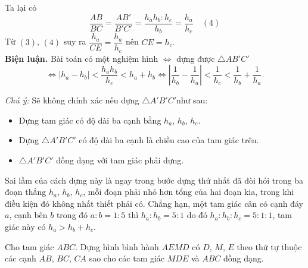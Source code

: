 \begin{bt}
{Ta lại có
$$\dfrac{AB}{BC}=\dfrac{AB'}{B'C'} =\dfrac{h_ah_b:h_c}{h_b}=\dfrac{h_a}{h_c} \quad (4)$$
Từ $ (3) $, $ (4) $ suy ra $ \dfrac{h_a}{CE}=\dfrac{h_a}{h_c} $ nên $ CE=h_c. $\\
\textbf{Biện luận.} Bài toán có một nghiệm hình $ \Leftrightarrow $ dựng được $ \triangle AB'C' $ 
$$ \Leftrightarrow \left|h_a-h_b\right| < \dfrac{h_ah_b}{h_c} < h_a + h_b \Leftrightarrow \left|\dfrac{1}{h_b}-\dfrac{1}{h_a}\right| < \dfrac{1}{h_c}<\dfrac{1}{h_b}+\dfrac{1}{h_a}. $$
\begin{note}{\textit{Chú ý: }}
Sẽ không chính xác nếu dựng $ \triangle A'B'C' $như sau:
\begin{itemize}
	\item Dựng tam giác có độ dài ba cạnh bằng $ h_a $, $ h_b $, $ h_c $.
	\item Dựng $ \triangle A'B'C' $ có độ dài ba cạnh là chiều cao của tam giác trên.
	\item $ \triangle A'B'C' $ đồng dạng với tam giác phải dựng.
\end{itemize}
Sai lầm của cách dựng này là ngay trong bước dựng thứ nhất đã đòi hỏi trong ba đoạn thẳng $ h_a $, $ h_b $, $ h_c $, mỗi đoạn phải nhỏ hơn tổng của hai đoạn kia, trong khi điều kiện đó không nhất thiết phải có. Chẳng hạn, một tam giác cân có cạnh đáy $ a $, cạnh bên $ b $ trong đó $ a:b=1:5 $ thì $ h_a:h_b = 5:1 $ do đó $ h_a:h_b:h_c=5:1:1 $, tam giác này có $ h_a>h_b+h_c $.
\end{note}
}
\end{bt}
\begin{bt}%
	Cho tam giác $ ABC $. Dựng hình bình hành $ AEMD $ có $ D $, $ M $, $ E $ theo thứ tự thuộc các cạnh $ AB $, $ BC $, $ CA $ sao cho các tam giác $ MDE $ và $ ABC $ đồng dạng.
\end{bt}
